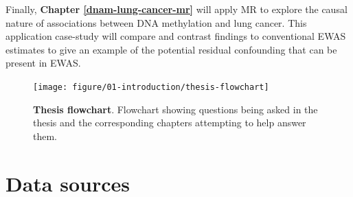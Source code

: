 \documentclass[11pt,oneside]{bristolthesis}
\begin{document}
Finally, \textbf{Chapter \ref{dnam-lung-cancer-mr}} will apply MR to explore the causal nature of associations between DNA methylation and lung cancer. This application case-study will compare and contrast findings to conventional EWAS estimates to give an example of the potential residual confounding that can be present in EWAS.




\begin{figure}

{\centering \texttt{[image: figure/01-introduction/thesis-flowchart]} 

}

\caption[Thesis flowchart]{\textbf{Thesis flowchart}. Flowchart showing questions being asked in the thesis and the corresponding chapters attempting to help answer them.}\label{fig:thesis-flowchart}
\end{figure}
\hypertarget{data-sources}{%
\chapter{Data sources}\label{data-sources}}
\end{document}
